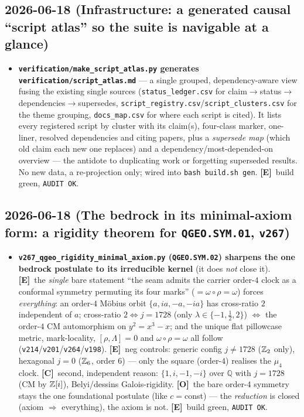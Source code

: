 \documentclass[11pt]{article}
\providecommand{\mE}{\textbf{[E]}}\providecommand{\mC}{\textbf{[C]}}
\providecommand{\mO}{\textbf{[O]}}\providecommand{\mX}{\textbf{[X]}}
\providecommand{\vref}[1]{\texttt{#1}}
\begin{document}
\subsection*{2026-06-18 (Infrastructure: a generated causal ``script atlas'' so the suite is navigable at a glance)}
\begin{itemize}
\item \textbf{\texttt{verification/make\_script\_atlas.py} generates \texttt{verification/script\_atlas.md}} ---
  a single grouped, dependency-aware view fusing the existing single sources (\texttt{status\_ledger.csv} for
  claim$\to$status$\to$dependencies$\to$supersedes, \texttt{script\_registry.csv}/\texttt{script\_clusters.csv}
  for the theme grouping, \texttt{docs\_map.csv} for where each script is cited). It lists every registered
  script by cluster with its claim(s), four-class marker, one-liner, resolved dependencies and citing papers,
  plus a \emph{supersede map} (which old claim each new one replaces) and a dependency/most-depended-on
  overview --- the antidote to duplicating work or forgetting superseded results. No new data, a re-projection
  only; wired into \texttt{bash build.sh gen}. \mE\ build green, \texttt{AUDIT OK}.
\end{itemize}

\subsection*{2026-06-18 (The bedrock in its minimal-axiom form: a rigidity theorem for \texttt{QGEO.SYM.01}, \texttt{v267})}
\begin{itemize}
\item \textbf{\texttt{v267\_qgeo\_rigidity\_minimal\_axiom.py} (\texttt{QGEO.SYM.02}) sharpens the one bedrock
  postulate to its irreducible kernel} (it does \emph{not} close it). \mE\ the \emph{single} bare statement
  ``the seam admits the carrier order-$4$ clock as a conformal symmetry permuting its four marks''
  ($=\omega\circ\rho=\omega$) forces \emph{everything}: an order-$4$ M\"obius orbit $\{a,ia,-a,-ia\}$ has
  cross-ratio $2$ independent of $a$; cross-ratio $2\Leftrightarrow j{=}1728$ (only $\lambda\in\{-1,\tfrac12,2\}$)
  $\Leftrightarrow$ the order-$4$ CM automorphism on $y^2{=}x^3{-}x$; and the unique flat pillowcase metric,
  mark-locality, $[\rho,\Lambda]{=}0$ and $\omega\circ\rho{=}\omega$ all follow (\vref{v214}/\vref{v201}/\vref{v264}/\vref{v198}).
  \mE\ neg controls: generic config $j\neq1728$ ($\mathbb{Z}_2$ only), hexagonal $j{=}0$ ($\mathbb{Z}_6$, order $6$) --- only
  the square (order-$4$) realises the $\mu_4$ clock. \mC\ second, independent reason: $\{1,i,-1,-i\}$ over
  $\mathbb Q$ with $j{=}1728$ (CM by $\mathbb{Z}[i]$), Belyi/dessins Galois-rigidity. \mO\ the bare order-$4$ symmetry stays
  the one foundational postulate (like $c{=}$const) --- the \emph{reduction} is closed (axiom $\Rightarrow$
  everything), the axiom is not. \mE\ build green, \texttt{AUDIT OK}.
\end{itemize}
\end{document}
